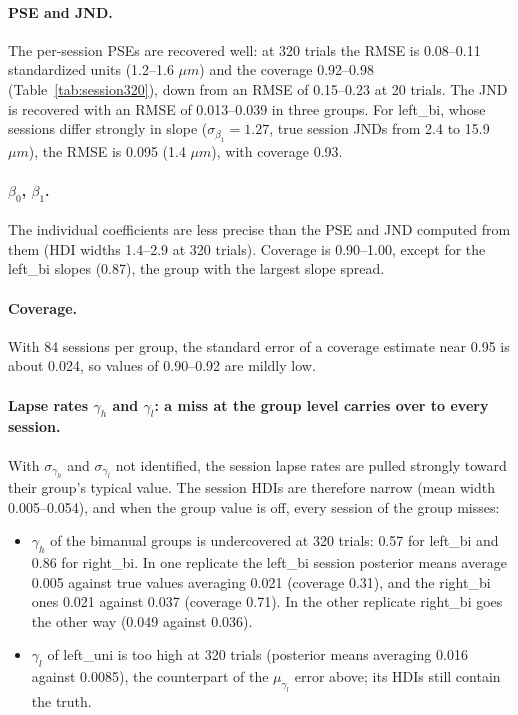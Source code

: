 \documentclass[11pt]{article}
\begin{document}
\paragraph{PSE and JND.} The per-session PSEs are recovered well: at 320 trials the
RMSE is 0.08--0.11 standardized units (1.2--1.6 $\mu m$) and the coverage 0.92--0.98
(Table~\ref{tab:session320}), down from an RMSE of 0.15--0.23 at 20 trials. The JND
is recovered with an RMSE of 0.013--0.039 in three groups. For left\_bi, whose sessions
differ strongly in slope ($\sigma_{\beta_1} = 1.27$, true session JNDs from 2.4 to
15.9 $\mu m$), the RMSE is 0.095 (1.4 $\mu m$), with coverage 0.93.

\paragraph{$\beta_0$, $\beta_1$.} The individual coefficients are less precise than the
PSE and JND computed from them (HDI widths 1.4--2.9 at 320 trials). Coverage is 0.90--1.00,
except for the left\_bi slopes (0.87), the group with the largest slope spread.

\paragraph{Coverage.} With 84 sessions per group, the standard error of a coverage
estimate near 0.95 is about 0.024, so values of 0.90--0.92 are mildly low.

\paragraph{Lapse rates $\gamma_h$ and $\gamma_l$: a miss at the group level carries over
to every session.} With $\sigma_{\gamma_h}$ and $\sigma_{\gamma_l}$ not identified, the
session lapse rates are pulled strongly toward their group's typical value. The
session HDIs are therefore narrow (mean width 0.005--0.054), and when the group value
is off, every session of the group misses:
\begin{itemize}
  \item $\gamma_h$ of the bimanual groups is undercovered at 320 trials: 0.57 for
        left\_bi and 0.86 for right\_bi. In one replicate the left\_bi session
        posterior means average 0.005 against true values averaging 0.021 (coverage
        0.31), and the right\_bi ones 0.021 against 0.037 (coverage 0.71). In the other
        replicate right\_bi goes the other way (0.049 against 0.036).
  \item $\gamma_l$ of left\_uni is too high at 320 trials (posterior means averaging 0.016
        against 0.0085), the counterpart of the $\mu_{\gamma_l}$ error above; its HDIs
        still contain the truth.
\end{itemize}
\end{document}
